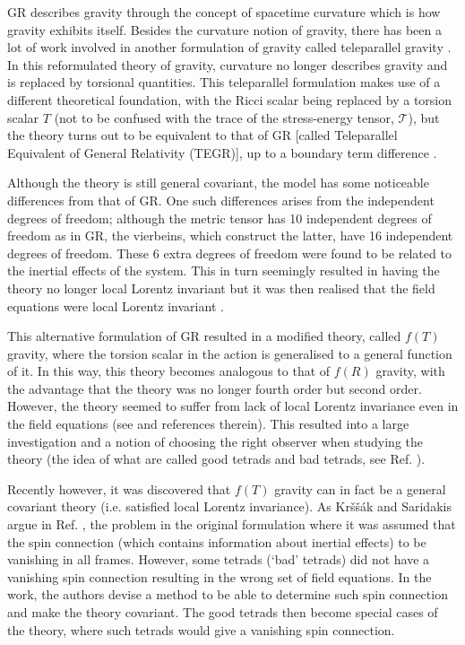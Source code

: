 \documentclass[prl,floatfix,showpacs,twocolumn,preprintnumbers,amsmath,amssymb,superscriptaddress]{revtex4}
\begin{document}
GR describes gravity through the concept of spacetime curvature which is how gravity exhibits itself. Besides the curvature notion of gravity, there has been a lot of work involved in another formulation of gravity called teleparallel gravity \cite{DeAndrade:2000sf,aldrovandi2012teleparallel}. In this reformulated theory of gravity, curvature no longer describes gravity and is replaced by torsional quantities. This teleparallel formulation makes use of a different theoretical foundation, with the Ricci scalar being replaced by a torsion scalar $T$ (not to be confused with the trace of the stress-energy tensor, $\mathcal{T}$), but the theory turns out to be equivalent to that of GR [called Teleparallel Equivalent of General Relativity (TEGR)], up to a boundary term difference \cite{Garecki:2010jj,Maluf:2013gaa,Arcos:2005ec}.

Although the theory is still general covariant, the model has some noticeable differences from that of GR. One such differences arises from the independent degrees of freedom; although the metric tensor has 10 independent degrees of freedom as in GR, the vierbeins, which construct the latter, have 16 independent degrees of freedom. These 6 extra degrees of freedom were found to be related to the inertial effects of the system. This in turn seemingly resulted in having the theory no longer local Lorentz invariant but it was then realised that the field equations were local Lorentz invariant \cite{Obukhov:2006sk}.

This alternative formulation of GR resulted in a modified theory, called $f(T)$ gravity, where the torsion scalar in the action is generalised to a general function of it. In this way, this theory becomes analogous to that of $f(R)$ gravity, with the advantage that the theory was no longer fourth order but second order. However, the theory seemed to suffer from lack of local Lorentz invariance even in the field equations (see \cite{Cai:2015emx} and references therein). This resulted into a large investigation and a notion of choosing the right observer when studying the theory (the idea of what are called good tetrads and bad tetrads, see Ref. \cite{Tamanini:2012hg}). 

Recently however, it was discovered that $f(T)$ gravity can in fact be a general covariant theory (i.e. satisfied local Lorentz invariance). As Kr\v{s}\v{s}\'{a}k and Saridakis argue in Ref. \cite{Krssak:2015oua}, the problem in the original formulation where it was assumed that the spin connection (which contains information about inertial effects) to be vanishing in all frames. However, some tetrads (`bad' tetrads) did not have a vanishing spin connection resulting in the wrong set of field equations. In the work, the authors devise a method to be able to determine such spin connection and make the theory covariant. The good tetrads then become special cases of the theory, where such tetrads would give a vanishing spin connection.
\end{document}
